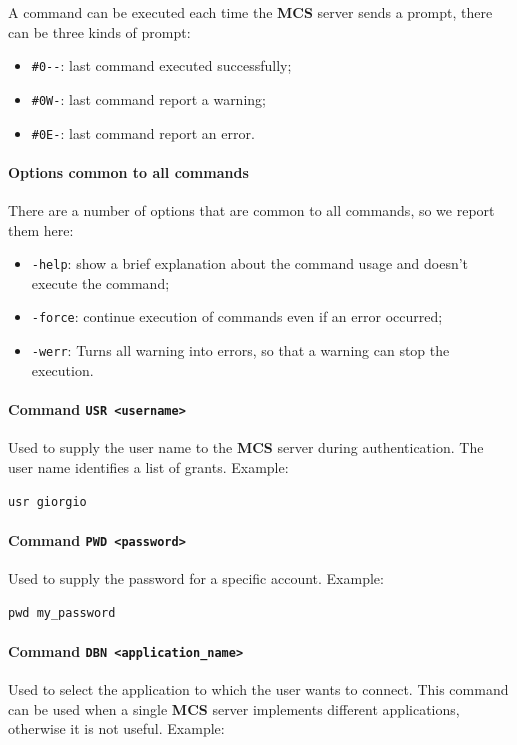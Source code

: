 \documentclass[12pt,titlepage]{article}
\newcommand{\mcs}{\textbf{MCS} }
\begin{document}
%
\noindent A command can be executed each time the \mcs server sends a
prompt, there can be three kinds of prompt:
\begin{itemize}
\item \verb|#0--|: last command executed successfully;
\item \verb|#0W-|: last command report a warning;
\item \verb|#0E-|: last command report an error.
\end{itemize}

%
\paragraph{Options common to all commands}
There are a number of options that are common to all commands, so we
report them here:
\begin{itemize}
\item \verb|-help|: show a brief explanation about the command usage
  and doesn't execute the command;
\item \verb|-force|: continue execution of commands even if an error
  occurred;
\item \verb|-werr|: Turns all warning into errors, so that a warning
  can stop the execution.
\end{itemize}

%
\paragraph{Command \texttt{USR <username>}}
Used to supply the user name to the \mcs server during
authentication. The user name identifies a list of grants. Example:

\bigskip
\verb|usr giorgio|
\bigskip

\paragraph{Command \texttt{PWD <password>}}
Used to supply the password for a specific account. Example:

\bigskip
\verb|pwd my_password|
\bigskip

%
\paragraph{Command \texttt{DBN <application\_name>}}
Used to select the application to which the user wants to connect. This
command can be used when a single \mcs server implements different
applications, otherwise it is not useful. Example:
\end{document}
